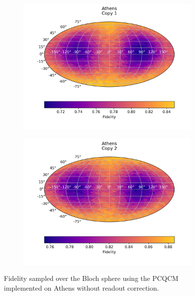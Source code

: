  \begin{figure}[H]
    \centering
    \begin{subfigure}{.5\textwidth}
      \centering
      \includegraphics[width=\textwidth]{Figures/PhaseCovariant/IBM/FullSphere/results_athens_copy1.png}
      \label{fig:pc_uncorrected_athens_sphere_1}
    \end{subfigure}%
    \begin{subfigure}{.5\textwidth}
      \centering
      \includegraphics[width=\textwidth]{Figures/PhaseCovariant/IBM/FullSphere/results_athens_copy2.png}
      \label{fig:pc_uncorrected_athens_sphere_2}
    \end{subfigure}
    \caption{Fidelity sampled over the Bloch sphere using the PCQCM implemented on Athens without readout correction.}
    \label{fig:pc_uncorrected_athens_sphere}
  \end{figure}
  
